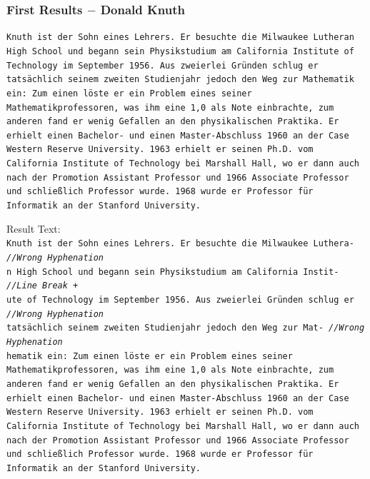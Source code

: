 \documentclass{beamer}
\begin{document}
\begin{frame}
\frametitle{First Results $-$ Donald Knuth}
\texttt{\tiny Knuth ist der Sohn eines Lehrers. Er besuchte die Milwaukee Lutheran \\
High School und begann sein Physikstudium am California Institute of \\
Technology im September 1956. Aus zweierlei Gründen schlug er \\
tatsächlich seinem zweiten Studienjahr jedoch den Weg zur Mathematik \\
ein: Zum einen löste er ein Problem eines seiner \\
Mathematikprofessoren, was ihm eine 1,0 als Note einbrachte, zum \\
anderen fand er wenig Gefallen an den physikalischen Praktika. Er \\
erhielt einen Bachelor- und einen Master-Abschluss 1960 an der Case \\
Western Reserve University. 1963 erhielt er seinen Ph.D. vom \\
California Institute of Technology bei Marshall Hall, wo er dann auch \\
nach der Promotion Assistant Professor und 1966 Associate Professor \\
und schließlich Professor wurde. 1968 wurde er Professor für \\
Informatik an der Stanford University.\\}

Result Text: \\

\texttt{\scriptsize{K}\tiny nuth ist der Sohn eines Lehrers. Er besuchte die Milwaukee Luthera- \hskip 18pt \emph{//Wrong Hyphenation} \\
\scriptsize{n} \tiny  High School und begann sein Physikstudium am California Instit- \hskip 33pt \emph{//Line Break +} \\
\scriptsize{u}\tiny te of Technology im September 1956. Aus zweierlei Gründen schlug er \hskip 23pt \emph{//Wrong Hyphenation} \\
\scriptsize{t}\tiny atsächlich seinem zweiten Studienjahr jedoch den Weg zur Mat- \hskip 39pt \emph{//Wrong Hyphenation} \\
\scriptsize{h}\tiny ematik ein: Zum einen löste er ein Problem eines seiner \\
Mathematikprofessoren, was ihm eine 1,0 als Note einbrachte, zum \\
anderen fand er wenig Gefallen an den physikalischen Praktika. Er \\
erhielt einen Bachelor- und einen Master-Abschluss 1960 an der Case \\
Western Reserve University. 1963 erhielt er seinen Ph.D. vom \\
California Institute of Technology bei Marshall Hall, wo er dann auch \\
nach der Promotion Assistant Professor und 1966 Associate Professor \\
und schließlich Professor wurde. 1968 wurde er Professor für \\
Informatik an der Stanford University. \\}
\end{frame}
\end{document}
